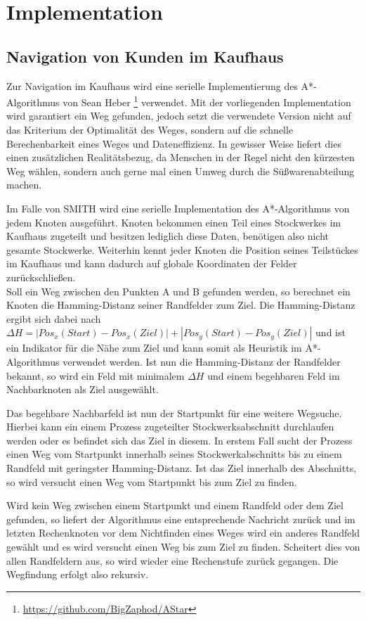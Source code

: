\section{Implementation}

\subsection{Navigation von Kunden im Kaufhaus}
\label{kundne:nav}
Zur Navigation im Kaufhaus wird eine serielle Implementierung des A*-Algorithmus von Sean Heber \footnote{\url{https://github.com/BigZaphod/AStar}} verwendet.
Mit der vorliegenden Implementation wird garantiert ein Weg gefunden, jedoch setzt die verwendete Version nicht auf das Kriterium der Optimalität des Weges, sondern auf die schnelle Berechenbarkeit eines Weges und Dateneffizienz. In gewisser Weise liefert dies einen zusätzlichen Realitätsbezug, da Menschen in der Regel nicht den kürzesten Weg wählen, sondern auch gerne mal einen Umweg durch die Süßwarenabteilung machen.

Im Falle von SMITH wird eine serielle Implementation des A*-Algorithmus von jedem Knoten ausgeführt. Knoten bekommen einen Teil eines Stockwerkes im Kaufhaus zugeteilt und besitzen lediglich diese Daten, benötigen also nicht gesamte Stockwerke. Weiterhin kennt jeder Knoten die Position seines Teilstückes im Kaufhaus und kann dadurch auf globale Koordinaten der Felder zurückschließen.\\
Soll ein Weg zwischen den Punkten A und B gefunden werden, so berechnet ein Knoten die Hamming-Distanz seiner Randfelder zum Ziel. Die Hamming-Distanz ergibt sich dabei nach $\Delta H = |Pos_x(Start)-Pos_x(Ziel)| + |Pos_y(Start)-Pos_y(Ziel)|$ und ist ein Indikator für die Nähe zum Ziel und kann somit als Heuristik im A*-Algorithmus verwendet werden.
Ist nun die Hamming-Distanz der Randfelder bekannt, so wird ein Feld mit minimalem $\Delta H$ und einem begehbaren Feld im Nachbarknoten als Ziel ausgewählt.

Das begehbare Nachbarfeld ist nun der Startpunkt für eine weitere Wegsuche. Hierbei kann ein einem Prozess zugeteilter Stockwerksabschnitt durchlaufen werden oder es befindet sich das Ziel in diesem. In erstem Fall sucht der Prozess einen Weg vom Startpunkt innerhalb seines Stockwerkabschnitts bis zu einem Randfeld mit geringster Hamming-Distanz. Ist das Ziel innerhalb des Abschnitts, so wird versucht einen Weg vom Startpunkt bis zum Ziel zu finden.

Wird kein Weg zwischen einem Startpunkt und einem Randfeld oder dem Ziel gefunden, so liefert der Algorithmus eine entsprechende Nachricht zurück und im letzten Rechenknoten vor dem Nichtfinden eines Weges wird ein anderes Randfeld gewählt und es wird versucht einen Weg bis zum Ziel zu finden. Scheitert dies von allen Randfeldern aus, so wird wieder eine Rechenstufe zurück gegangen. Die Wegfindung erfolgt also rekursiv.

